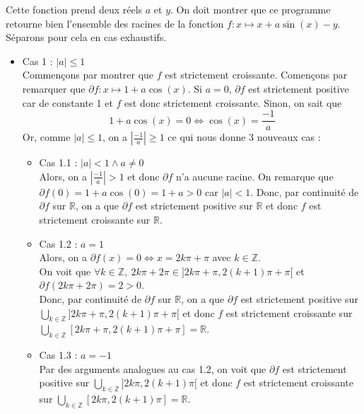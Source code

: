 \documentclass[a4paper, 12pt]{article}
\begin{document}
Cette fonction prend deux réels \( a \) et \( y \). On doit montrer que ce programme retourne bien l'ensemble des racines de la fonction \( f : x \mapsto x + a \sin(x) - y \). \\
Séparons pour cela en cas exhaustifs.
\begin{itemize}

    \item Cas 1 : \( |a| \leq 1 \) \\
Commençons par montrer que \( f \) est strictement croissante. Començons par remarquer que \( \partial f : x \mapsto 1 + a \cos(x) \). Si \( a = 0 \), \( \partial f \) est strictement positive car de constante 1 et \( f \) est donc strictement croissante. Sinon, on sait que
$$
1 + a \cos(x) = 0 \Longleftrightarrow \cos(x) = \frac{-1}{a}
$$
Or, comme \( |a| \leq 1 \), on a \( \left|\frac{-1}{a}\right| \geq 1 \) ce qui nous donne 3 nouveaux cas :

    \begin{itemize}
    
        \item Cas 1.1 : \( |a| < 1 \land a \neq 0 \) \\
Alors, on a \( \left|\frac{-1}{a}\right| > 1 \) et donc \( \partial f \) n'a aucune racine. On remarque que \( \partial f (0) = 1 + a \cos(0) = 1 + a > 0 \) car \( |a| < 1 \). Donc, par continuité de \( \partial f \) sur \( \mathbb{R} \), on a que \( \partial f \) est strictement positive sur \( \mathbb{R} \) et donc \( f \) est strictement croissante sur \( \mathbb{R} \). \\

        \item Cas 1.2 : \( a = 1 \) \\
Alors, on a \( \partial f(x) = 0 \Longleftrightarrow x = 2k\pi + \pi \) avec \( k \in \mathbb{Z} \). \\
On voit que \( \forall k \in \mathbb{Z},~ 2k\pi + 2\pi \in ]2k\pi + \pi, 2(k+1)\pi + \pi[ \) et \( \partial f(2k\pi + 2\pi) = 2 > 0 \). \\
Donc, par continuité de \( \partial f \) sur \( \mathbb{R} \), on a que \( \partial f \) est strictement positive sur \\
\( \displaystyle \bigcup_{k \in \mathbb{Z}} ]2k\pi + \pi, 2(k+1)\pi + \pi[ \) et donc \( f \) est strictement croissante sur \\
\( \displaystyle \bigcup_{k \in \mathbb{Z}} [2k\pi + \pi, 2(k+1)\pi + \pi] = \mathbb{R} \).

        \item Cas 1.3 : \( a = -1 \) \\
Par des arguments analogues au cas 1.2, on voit que \( \partial f \) est strictement positive sur \( \displaystyle \bigcup_{k \in \mathbb{Z}} ]2k\pi, 2(k+1)\pi[ \) et donc \( f \) est strictement croissante sur \( \displaystyle \bigcup_{k \in \mathbb{Z}} [2k\pi, 2(k+1)\pi] = \mathbb{R} \).
        

\end{itemize}
\end{itemize}
\end{document}
